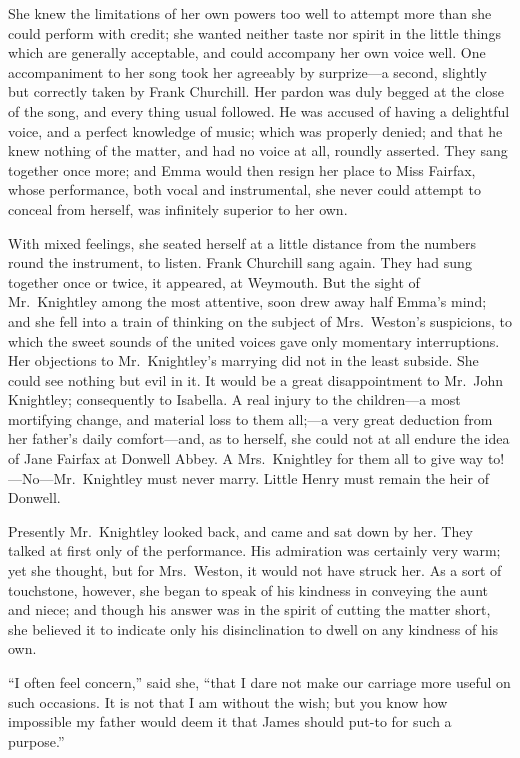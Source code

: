 She knew the limitations of her own powers too well to attempt
more than she could perform with credit; she wanted neither taste
nor spirit in the little things which are generally acceptable,
and could accompany her own voice well.  One accompaniment to her song
took her agreeably by surprize---a second, slightly but correctly
taken by Frank Churchill.  Her pardon was duly begged at the close
of the song, and every thing usual followed.  He was accused
of having a delightful voice, and a perfect knowledge of music;
which was properly denied; and that he knew nothing of the matter,
and had no voice at all, roundly asserted.  They sang together
once more; and Emma would then resign her place to Miss Fairfax,
whose performance, both vocal and instrumental, she never could
attempt to conceal from herself, was infinitely superior to her own.

With mixed feelings, she seated herself at a little distance from the
numbers round the instrument, to listen.  Frank Churchill sang again.
They had sung together once or twice, it appeared, at Weymouth.
But the sight of Mr.\ Knightley among the most attentive, soon drew
away half Emma's mind; and she fell into a train of thinking
on the subject of Mrs.\ Weston's suspicions, to which the sweet
sounds of the united voices gave only momentary interruptions.
Her objections to Mr.\ Knightley's marrying did not in the least subside.
She could see nothing but evil in it.  It would be a great
disappointment to Mr.\ John Knightley; consequently to Isabella.
A real injury to the children---a most mortifying change,
and material loss to them all;---a very great deduction from her
father's daily comfort---and, as to herself, she could not at all
endure the idea of Jane Fairfax at Donwell Abbey.  A Mrs.\ Knightley
for them all to give way to!---No---Mr.\ Knightley must never marry.
Little Henry must remain the heir of Donwell.

Presently Mr.\ Knightley looked back, and came and sat down by her.
They talked at first only of the performance.  His admiration
was certainly very warm; yet she thought, but for Mrs.\ Weston,
it would not have struck her.  As a sort of touchstone, however,
she began to speak of his kindness in conveying the aunt and niece;
and though his answer was in the spirit of cutting the matter short,
she believed it to indicate only his disinclination to dwell on any
kindness of his own.

``I often feel concern,'' said she, ``that I dare not make our carriage
more useful on such occasions.  It is not that I am without the wish;
but you know how impossible my father would deem it that James
should put-to for such a purpose.''

